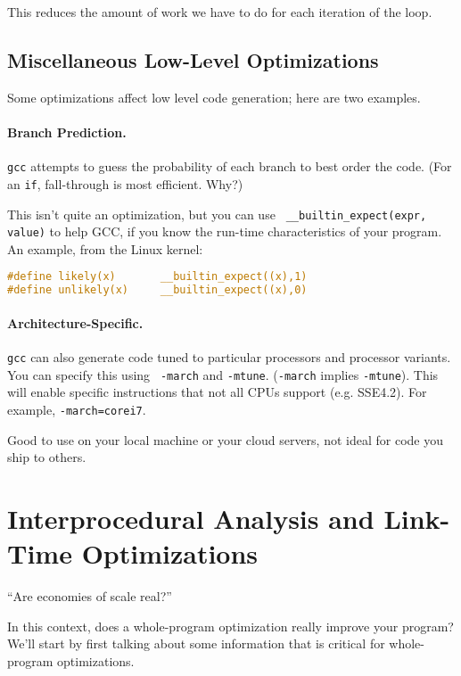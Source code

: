This reduces the amount of work we have to do for each iteration of the loop.


\subsection*{Miscellaneous Low-Level Optimizations}
Some optimizations affect low level code generation; here are two examples.

\paragraph{Branch Prediction.} {\tt gcc} attempts to guess the probability of each branch to
best order the code. (For an {\tt if}, fall-through is most efficient. Why?)

This isn't quite an optimization, but you can use {\tt
  \_\_builtin\_expect(expr, value)} to help GCC, if you know the
run-time characteristics of your program. An example, from the
  Linux kernel:

  \begin{lstlisting}[language=C]
#define likely(x)       __builtin_expect((x),1)
#define unlikely(x)     __builtin_expect((x),0)
  \end{lstlisting}

\paragraph{Architecture-Specific.} {\tt gcc} can also generate code tuned to particular
processors and processor variants. You can specify this using {\tt
  -march} and {\tt -mtune}. ({\tt -march} implies {\tt -mtune}).
This will enable specific instructions that not all CPUs support (e.g. SSE4.2).
For example, {\tt -march=corei7}.

\noindent
Good to use on your local machine or your cloud servers, not ideal for code you ship to others.


\section*{Interprocedural Analysis and Link-Time Optimizations}
\hfill ``Are economies of scale real?''

In this context, does a
whole-program optimization really improve your program?
We'll start by first talking about some information that is critical for
whole-program optimizations.


